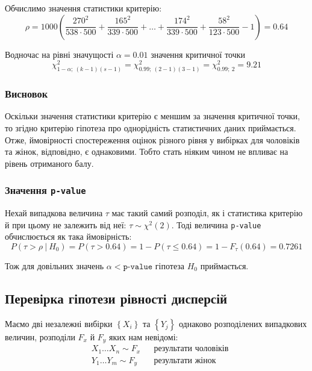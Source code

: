 Обчислимо значення статистики критерію:
\begin{equation*}
    \rho = 1000\left( \frac{270^2}{538\cdot 500}+\frac{165^2}{339\cdot 500} + \ldots + 
    \frac{174^2}{339\cdot 500}+\frac{58^2}{123\cdot 500} - 1 \right) = 0.64
\end{equation*}

Водночас на рівні значущості $\alpha=0.01$ значення критичної точки
\begin{equation*} 
    \chi^2_{1-\alpha;\ (k-1)(s-1)}=\chi^2_{0.99;\ (2-1)(3-1)}=\chi^2_{0.99;\ 2}=9.21
\end{equation*}

\subsubsection{Висновок}

Оскільки значення статистики критерію є меншим за значення критичної точки, то згідно критерію гіпотеза 
про однорідність статистичних даних приймається. Отже, ймовірності спостереження оцінок різного рівня у 
вибірках для чоловіків та жінок, відповідно, є однаковими. Тобто стать ніяким чином не впливає на рівень 
отриманого балу.

\subsubsection*{Значення \texttt{p-value}}

Нехай випадкова величина $\tau$ має такий самий розподіл, як і статистика критерію й при цьому не залежить 
від неї: $\tau\sim\chi^2(2)$. Тоді величина \texttt{p-value} обчислюється як така ймовірність:
\[ P(\tau>\rho\ |\ H_0) = P(\tau>0.64) = 1-P(\tau\leqslant0.64) = 1-F_{\tau}(0.64) = 0.7261 \]

Тож для довільних значень $\alpha < \texttt{p-value}$ гіпотеза $H_0$ приймається.

\subsection{Перевірка гіпотези рівності дисперсій}

Маємо дві незалежні вибірки $\left\{ X_i \right\}$ та $\left\{ Y_j \right\}$ 
однаково розподілених випадкових величин, розподіли $F_x$ й $F_y$ яких нам невідомі:
\begin{align*}
    &X_1 \ldots X_n\sim F_x && \text{результати чоловіків} \\
    &Y_1 \ldots Y_m\sim F_y && \text{результати жінок}
\end{align*}

